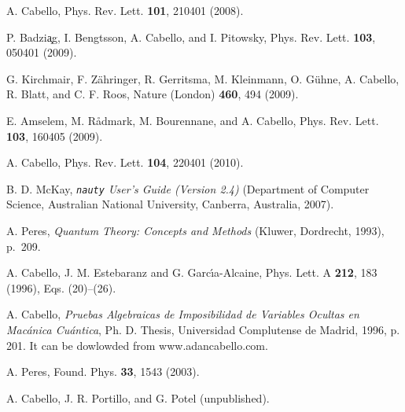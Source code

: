 \documentclass[twocolumn,aps,pra,showpacs]{revtex4-1}
\begin{document}
\begin{thebibliography}{99}

 A. Cabello,
 Phys. Rev. Lett. {\bf 101}, 210401 (2008).

 P. Badzi{\c a}g, I. Bengtsson, A. Cabello, and I. Pitowsky,
 Phys. Rev. Lett. {\bf 103}, 050401 (2009).

 G. Kirchmair, F. Z\"ahringer, R. Gerritsma, M. Kleinmann,
 O. G{\"u}hne, A. Cabello, R. Blatt, and C. F. Roos,
 Nature (London) {\bf 460}, 494 (2009).

 E. Amselem, M. R{\aa }dmark, M. Bourennane, and A. Cabello,
 Phys. Rev. Lett. {\bf 103}, 160405 (2009).

 A. Cabello,
 Phys. Rev. Lett. {\bf 104}, 220401 (2010).


 B. D. McKay,
 {\em {\tt nauty} User's Guide (Version 2.4)}
 (Department of Computer Science, Australian National
 University, Canberra, Australia, 2007).

 A. Peres,
 {\em Quantum Theory: Concepts and Methods}
 (Kluwer, Dordrecht, 1993), p.~209.


 A. Cabello, J. M. Estebaranz and G. Garc\'{\i}a-Alcaine,
 Phys. Lett. A {\bf 212}, 183 (1996), Eqs. (20)--(26).

 A. Cabello,
 {\em Pruebas Algebraicas de Imposibilidad de Variables Ocultas
 en Mac\'anica Cu\'antica}, Ph. D. Thesis, Universidad
 Complutense de Madrid, 1996, p. 201. It can be dowlowded from
 www.adancabello.com.


 A. Peres,
 Found. Phys. {\bf 33}, 1543 (2003).

 A. Cabello, J. R. Portillo, and G. Potel
 (unpublished).


\end{thebibliography}
\end{document}
